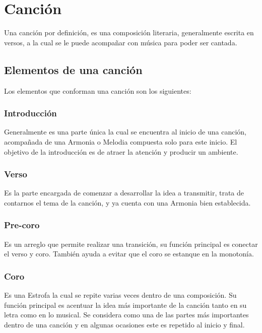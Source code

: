\documentclass[12pt, a4paper, titlepage]{report}
\begin{document}
	    \section{Canción}
	    Una canción por definición, es una composición literaria, generalmente escrita en versos, a la cual se le puede acompañar con música para poder ser cantada.\cite{refEstructuraCancion1}\par
			\subsection{Elementos de una canción}
			Los elementos que conforman una canción son los siguientes:

				\subsubsection*{Introducción}\par
				Generalmente es una parte única la cual se encuentra al inicio de una canción, acompañada de una \gls{Armonia} o \gls{Melodia} compuesta solo para este inicio. El objetivo de la introducción es de atraer la atención y producir un ambiente.\cite{refEstructuraCancion2}\par
				\subsubsection*{Verso}\par
				Es la parte encargada de comenzar a desarrollar la idea a transmitir, trata de contarnos el tema de la canción, y ya cuenta con una \gls{Armonia} bien establecida.\par
				\subsubsection*{Pre-coro}\par
				Es un arreglo que permite realizar una transición, su función principal es conectar el verso y coro. También ayuda a evitar que el coro se estanque en la monotonía.\par
				\subsubsection*{Coro}\par
				Es una \gls{Estrofa} la cual se repite varias veces dentro de una composición. Su función principal es acentuar la idea más importante de la canción tanto en su letra como en lo musical. Se considera como una de las partes más importantes dentro de una canción y en algunas ocasiones este es repetido al inicio y final.\par
\end{document}
